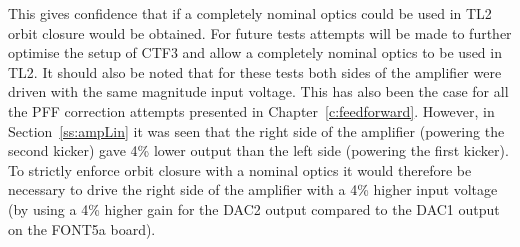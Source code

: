 This gives confidence that if a completely nominal optics could be 
used in TL2 orbit closure would be obtained. For future tests attempts 
will be made to further optimise the setup of CTF3 and allow a 
completely nominal optics to be used in TL2. It should also be 
noted that for these tests both sides of the amplifier were driven with the same magnitude input voltage. This has also been the case for 
all the PFF correction attempts presented in Chapter~\ref{c:feedforward}. 
However, in Section~\ref{ss:ampLin} it was seen that the right side of the amplifier (powering the second kicker) gave 4\% lower output than the left side (powering the first kicker).
To strictly enforce orbit closure with a nominal optics it would 
therefore be necessary to drive the right side of the amplifier with 
a 4\% higher input voltage (by using a 4\% higher gain for the DAC2 
output compared to the DAC1 output on the FONT5a board).







